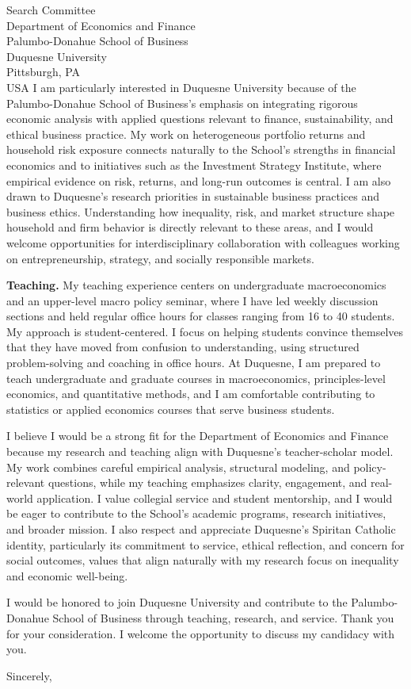 \documentclass[11pt,letterpaper]{letter}
\begin{document}
\begin{letter}{Search Committee \\
Department of Economics and Finance \\
Palumbo-Donahue School of Business \\
Duquesne University \\
Pittsburgh, PA \\ USA}
I am particularly interested in Duquesne University because of the Palumbo-Donahue School of Business’s emphasis on integrating rigorous economic analysis with applied questions relevant to finance, sustainability, and ethical business practice. My work on heterogeneous portfolio returns and household risk exposure connects naturally to the School’s strengths in financial economics and to initiatives such as the Investment Strategy Institute, where empirical evidence on risk, returns, and long-run outcomes is central. I am also drawn to Duquesne’s research priorities in sustainable business practices and business ethics. Understanding how inequality, risk, and market structure shape household and firm behavior is directly relevant to these areas, and I would welcome opportunities for interdisciplinary collaboration with colleagues working on entrepreneurship, strategy, and socially responsible markets.

\textbf{Teaching.} My teaching experience centers on undergraduate macroeconomics and an upper-level macro policy seminar, where I have led weekly discussion sections and held regular office hours for classes ranging from 16 to 40 students. My approach is student-centered. I focus on helping students convince themselves that they have moved from confusion to understanding, using structured problem-solving and coaching in office hours. At Duquesne, I am prepared to teach undergraduate and graduate courses in macroeconomics, principles-level economics, and quantitative methods, and I am comfortable contributing to statistics or applied economics courses that serve business students.

I believe I would be a strong fit for the Department of Economics and Finance because my research and teaching align with Duquesne’s teacher-scholar model. My work combines careful empirical analysis, structural modeling, and policy-relevant questions, while my teaching emphasizes clarity, engagement, and real-world application. I value collegial service and student mentorship, and I would be eager to contribute to the School’s academic programs, research initiatives, and broader mission. I also respect and appreciate Duquesne’s Spiritan Catholic identity, particularly its commitment to service, ethical reflection, and concern for social outcomes, values that align naturally with my research focus on inequality and economic well-being.

I would be honored to join Duquesne University and contribute to the Palumbo-Donahue School of Business through teaching, research, and service. Thank you for your consideration. I welcome the opportunity to discuss my candidacy with you.

\closing{Sincerely,}

\end{letter}
\end{document}

